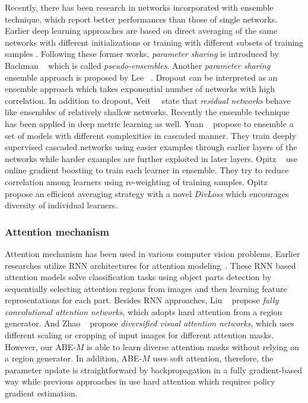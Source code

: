 \documentclass[runningheads]{llncs}
\begin{document}
Recently, there has been research in networks incorporated with ensemble technique, which report better performances than those of single networks.
Earlier deep learning approaches are based on direct averaging of the same networks with different initializations \cite{lee2015deeply,russakovsky2015imagenet} or training with different subsets of training samples \cite{Szegedy_2015_CVPR,sutskever2014sequence}.
Following these former works, \emph{parameter sharing} is introduced by Bachman \etal~\cite{bachman2014learning} which is called \emph{pseudo-ensembles}.
Another \emph{parameter sharing} ensemble approach is proposed by Lee \etal~\cite{lee2015m}.
Dropout \cite{srivastava2014dropout} can be interpreted as an ensemble approach which takes exponential number of networks with high correlation.
In addition to dropout, Veit~\etal~\cite{veit2016residual} state that \emph{residual networks} behave like ensembles of relatively shallow networks.
Recently the ensemble technique has been applied in deep metric learning as well.
Yuan \etal~\cite{yuan2016hard} propose to ensemble a set of models with different complexities in cascaded manner.
They train deeply supervised cascaded networks using easier examples through earlier layers of the networks while harder examples are further exploited in later layers.
Opitz \etal~\cite{opitz2017bier} use online gradient boosting to train each learner in ensemble.
They try to reduce correlation among learners using re-weighting of training samples.
Opitz \etal~\cite{opitz2016efficient} propose an efficient averaging strategy with a novel \emph{DivLoss} which encourages diversity of individual learners.


\vspace{-5mm}
\subsubsection{Attention mechanism}
\label{sec:related-attention}
Attention mechanism has been used in various computer vision problems.
Earlier researches utilize RNN architectures for attention modeling~\cite{sermanet2014attention,mnih2014recurrent,ba2014multiple}.
These RNN based attention models solve classification tasks using object parts detection by sequentially selecting attention regions from images and then learning feature representations for each part.
Besides RNN approaches, Liu \etal~\cite{liu2016fully} propose \emph{fully convolutional attention networks}, which adopts hard attention from a region generator.
And Zhao \etal~\cite{zhao2017diversified} propose \emph{diversified visual attention networks}, which uses different scaling or cropping of input images for different attention masks.
However, our ABE-$M$ is able to learn diverse attention masks without relying on a region generator.
In addition, ABE-$M$ uses soft attention, therefore, the parameter update is straightforward by backpropagation in a fully gradient-based way while previous approaches in \cite{sermanet2014attention,mnih2014recurrent,ba2014multiple,liu2016fully,zhao2017diversified} use hard attention which requires policy gradient estimation.
\end{document}
